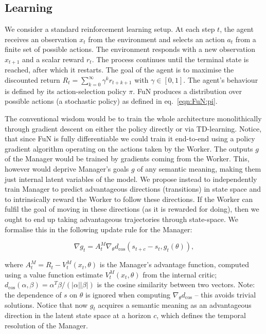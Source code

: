 
\subsection{Learning}
\subseckiny
\label{sec:Learning}

We consider a standard reinforcement learning setup. At each step $t$, the agent receives an observation $x_t$ from the environment and selects an action $a_t$ from a finite set of possible actions. The environment responds with a new observation $x_{t+1}$ and a scalar reward $r_t$. The process continues until the terminal state is reached, after which it restarts. The goal of the agent is to maximise the discounted return 
$R_t= \sum_{k=0}^{\infty} \gamma^k r_{t+k+1}$ with $\gamma \in [0,1]$. The agent's behaviour is defined by its action-selection policy $\pi$. FuN produces a distribution over possible actions (a stochastic policy) as defined in eq.~\ref{eqn:FuN:pi}.

The conventional wisdom would be to train the whole architecture monolithically through gradient descent on either the policy directly or via TD-learning. Notice, that since FuN is fully differentiable we could train it end-to-end using a policy gradient algorithm operating on the actions taken by the Worker. The outputs $g$ of the Manager would be trained by gradients coming from the Worker. This, however would deprive Manager's goals $g$ of any semantic meaning, making them just internal latent variables of the model. 
We propose instead to independently train Manager to predict advantageous directions (transitions) in state space and to intrinsically reward the Worker to follow these directions.
If the Worker can fulfil the goal of moving in these directions (as it is rewarded for doing), then we ought to end up taking advantageous trajectories through state-space.
We formalise this in the following update rule for the Manager:

\begin{equation}
\nabla g_t = A^M_t \nabla_{\theta} d_{\cos}(s_{t+c} - s_t, g_t(\theta)),
\label{eqn:manager_update}
\end{equation}

where $A^M_t = R_t - V^M_t(x_t,\theta)$ is the Manager's advantage function, computed using a value function estimate $V^M_t(x_t,\theta)$ from the internal critic; $d_{\cos}(\alpha,\beta)=\alpha^T\beta/(|\alpha||\beta|)$ is the cosine similarity between two vectors. Note: the dependence of $s$ on $\theta$ is ignored when computing $\nabla_{\theta} d_{\cos}$ -- 
this avoids trivial solutions. Notice that now $g_t$ acquires a semantic meaning as an advantageous direction in the latent state space at a horizon $c$, which defines the temporal resolution of the Manager. 


